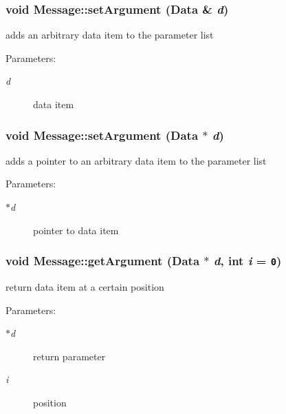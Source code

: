 \subsubsection[setArgument]{\setlength{\rightskip}{0pt plus 5cm}void Message::setArgument ({\bf Data} \& {\em d})}\label{classMessage_bbfe510ac32e43fc001fd36dbf5fc854}


adds an arbitrary data item to the parameter list \begin{Desc}
\item[Parameters:]
\begin{description}
\item[{\em d}]data item \end{description}
\end{Desc}
\subsubsection[setArgument]{\setlength{\rightskip}{0pt plus 5cm}void Message::setArgument ({\bf Data} $\ast$ {\em d})}\label{classMessage_975ed4851d03e7ab133845f3853eb16a}


adds a pointer to an arbitrary data item to the parameter list \begin{Desc}
\item[Parameters:]
\begin{description}
\item[{\em $\ast$d}]pointer to data item \end{description}
\end{Desc}
\subsubsection[getArgument]{\setlength{\rightskip}{0pt plus 5cm}void Message::getArgument ({\bf Data} $\ast$ {\em d}, \/  int {\em i} = {\tt 0})}\label{classMessage_2eca50ea10caf3df77ac0a132fdfa4d7}


return data item at a certain position \begin{Desc}
\item[Parameters:]
\begin{description}
\item[{\em $\ast$d}]return parameter \item[{\em i}]position \end{description}
\end{Desc}
